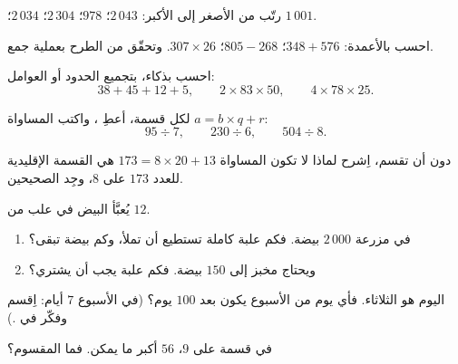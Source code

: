 \begin{exercise}[$\star$]\label{exo:g6:wholes:4}
رتّب من الأصغر إلى الأكبر: $2\,043$؛ $978$؛ $2\,304$؛ $2\,034$؛
$1\,001$.
\end{exercise}

\begin{exercise}[$\star$]\label{exo:g6:wholes:5}
احسب بالأعمدة: $348 + 576$؛ \quad $805 - 268$؛ \quad
$307 \times 26$. وتحقّق من الطرح بعملية جمع.
\end{exercise}

\begin{exercise}[$\star$]\label{exo:g6:wholes:6}
احسب بذكاء، بتجميع الحدود أو العوامل:
\[
38 + 45 + 12 + 5, \qquad
2 \times 83 \times 50, \qquad
4 \times 78 \times 25 .
\]
\end{exercise}

\begin{exercise}[$\star$]\label{exo:g6:wholes:7}
لكل قسمة، أعطِ  ، واكتب
المساواة $a = b \times q + r$:
\[
95 \div 7, \qquad
230 \div 6, \qquad
504 \div 8 .
\]
\end{exercise}

\begin{exercise}[$\star$]\label{exo:g6:wholes:8}
دون أن تقسم، اِشرح لماذا لا تكون المساواة $173 = 8 \times 20 + 13$
هي القسمة الإقليدية للعدد $173$ على $8$، وجِد 
 الصحيحين.
\end{exercise}

\begin{exercise}[$\star\star$]\label{exo:g6:wholes:9}
يُعبَّأ البيض في علب من $12$.
\begin{enumerate}
  \item في مزرعة $2\,000$ بيضة. فكم علبة كاملة تستطيع أن تملأ،
        وكم بيضة تبقى؟
  \item ويحتاج مخبز إلى $150$ بيضة. فكم علبة يجب أن يشتري؟
\end{enumerate}
\end{exercise}

\begin{exercise}[$\star\star$]\label{exo:g6:wholes:10}
اليوم هو الثلاثاء. فأي يوم من الأسبوع يكون بعد $100$ يوم؟
(في الأسبوع $7$ أيام: اِقسم وفكّر في .)
\end{exercise}

\begin{exercise}[$\star\star$]\label{exo:g6:wholes:11}
في قسمة على $9$،  $56$  أكبر ما
يمكن. فما المقسوم؟
\end{exercise}

